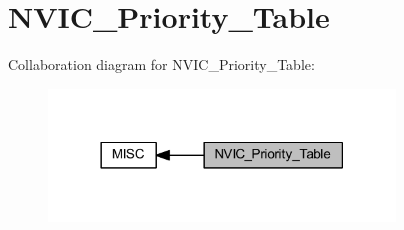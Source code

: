 \hypertarget{group___n_v_i_c___priority___table}{}\section{N\+V\+I\+C\+\_\+\+Priority\+\_\+\+Table}
\label{group___n_v_i_c___priority___table}
Collaboration diagram for N\+V\+I\+C\+\_\+\+Priority\+\_\+\+Table\+:
\nopagebreak
\begin{figure}[H]
\begin{center}
\leavevmode
\includegraphics[width=261pt]{group___n_v_i_c___priority___table}
\end{center}
\end{figure}
